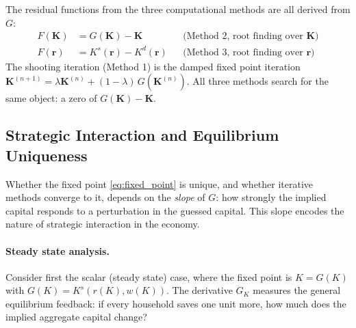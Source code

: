 \documentclass[12pt]{article}
\begin{document}
The residual functions from the three computational methods are all derived from $G$:
\begin{align}
    F(\mathbf{K}) &= G(\mathbf{K}) - \mathbf{K} & &\text{(Method 2, root finding over $\mathbf{K}$)} \label{eq:F_from_G_K}\\
    F(\mathbf{r}) &= K^s(\mathbf{r}) - K^d(\mathbf{r}) & &\text{(Method 3, root finding over $\mathbf{r}$)} \label{eq:F_from_G_r}
\end{align}
The shooting iteration (Method 1) is the damped fixed point iteration $\mathbf{K}^{(n+1)} = \lambda \mathbf{K}^{(n)} + (1-\lambda)\, G(\mathbf{K}^{(n)})$. All three methods search for the same object: a zero of $G(\mathbf{K}) - \mathbf{K}$.

\subsection{Strategic Interaction and Equilibrium Uniqueness}
\label{ssec:strategic_interaction}

Whether the fixed point \eqref{eq:fixed_point} is unique, and whether iterative methods converge to it, depends on the \emph{slope} of $G$: how strongly the implied capital responds to a perturbation in the guessed capital. This slope encodes the nature of strategic interaction in the economy.

\paragraph{Steady state analysis.} Consider first the scalar (steady state) case, where the fixed point is $K = G(K)$ with $G(K) = K^s(r(K), w(K))$. The derivative $G_K$ measures the general equilibrium feedback: if every household saves one unit more, how much does the implied aggregate capital change?
\end{document}
